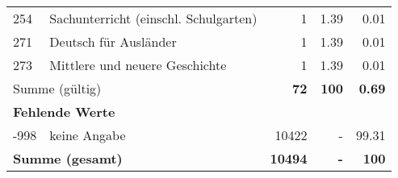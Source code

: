 \begin{longtable}{lXrrr}
        254 & \multicolumn{1}{X}{Sachunterricht (einschl. Schulgarten)} & %
          \num{1} &
          \num[round-mode=places,round-precision=2]{1,39} &
          \num[round-mode=places,round-precision=2]{0,01} \\

        271 & \multicolumn{1}{X}{Deutsch für Ausländer} & %
          \num{1} &
          \num[round-mode=places,round-precision=2]{1,39} &
          \num[round-mode=places,round-precision=2]{0,01} \\

        273 & \multicolumn{1}{X}{Mittlere und neuere Geschichte} & %
          \num{1} &
          \num[round-mode=places,round-precision=2]{1,39} &
          \num[round-mode=places,round-precision=2]{0,01} \\

     \midrule
     \multicolumn{2}{l}{Summe (gültig)} &
       \textbf{\num{72}} &
     \textbf{100} &
       \textbf{\num[round-mode=places,round-precision=2]{0,69}} \\
     \multicolumn{5}{l}{\textbf{Fehlende Werte}}\\
       -998 &
       keine Angabe &
         \num{10422} &
        - &
         \num[round-mode=places,round-precision=2]{99,31} \\
     \midrule
     \multicolumn{2}{l}{\textbf{Summe (gesamt)}} &
          \textbf{\num{10494}} &
        \textbf{-} &
        \textbf{100} \\
     \bottomrule
     \end{longtable}
     
